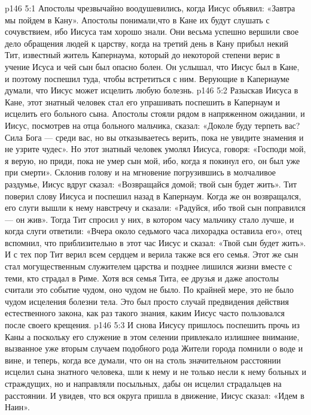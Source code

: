\vs p146 5:1 Апостолы чрезвычайно воодушевились, когда Иисус объявил: «Завтра мы пойдем в Кану». Апостолы понимали,что в Кане их будут слушать с сочувствием, ибо Иисуса там хорошо знали. Они весьма успешно вершили свое дело обращения людей к царству, когда на третий день в Кану прибыл некий Тит, известный житель Капернаума, который до некоторой степени верис в учение Исуса и чей сын был опасно болен. Он услышал, что Иисус был в Кане, и поэтому поспешил туда, чтобы встретиться с ним. Верующие в Капернауме думали, что Иисус может исцелить любую болезнь.
\vs p146 5:2 Разыскав Иисуса в Кане, этот знатный человек стал его упрашивать поспешить в Капернаум и исцелить его больного сына. Апостолы стояли рядом в напряженном ожидании, и Иисус, посмотрев на отца больного мальчика, сказал: «Доколе буду терпеть вас? Сила Бога --- среди вас, но вы отказываетесь верить, пока не увидите знамения и не узрите чудес». Но этот знатный человек умолял Иисуса, говоря: «Господи мой, я верую, но приди, пока не умер сын мой, ибо, когда я покинул его, он был уже при смерти». Склонив голову и на мгновение погрузившись в молчаливое раздумье, Иисус вдруг сказал: «Возвращайся домой; твой сын будет жить». Тит поверил слову Иисуса и поспешил назад в Капернаум. Когда же он возвращался, его слуги вышли к нему навстречу и сказали: «Радуйся, ибо твой сын поправился --- он жив». Тогда Тит спросил у них, в котором часу мальчику стало лучше, и когда слуги ответили: «Вчера около седьмого часа лихорадка оставила его», отец вспомнил, что приблизительно в этот час Иисус и сказал: «Твой сын будет жить». И с тех пор Тит верил всем сердцем и верила также вся его семья. Этот же сын стал могущественным служителем царства и позднее лишился жизни вместе с теми, кто страдал в Риме. Хотя вся семья Тита, ее друзья и даже апостолы считали это событие чудом, оно чудом не было. По крайней мере, это не было чудом исцеления болезни тела. Это был просто случай предвидения действия естественного закона, как раз такого знания, каким Иисус часто пользовался после своего крещения.
\vs p146 5:3 И снова Иисусу пришлось поспешить прочь из Каны а поскольку его служение в этом селении привлекало излишнее внимание, вызванное уже вторым случаем подобного рода Жители города помнили о воде и вине, и теперь, когда все думали, что он на столь значительном расстоянии исцелил сына знатного человека, шли к нему и не только несли к нему больных и страждущих, но и направляли посыльных, дабы он исцелил страдальцев на расстоянии. И увидев, что вся округа пришла в движение, Иисус сказал: «Идем в Наин».
